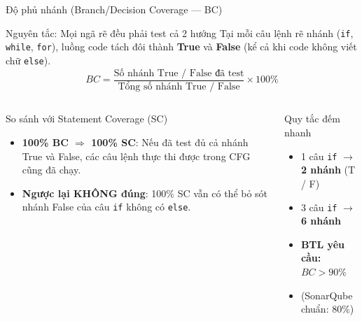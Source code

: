 \documentclass[aspectratio=169,12pt]{beamer}
\begin{document}
\begin{frame}[shrink=10]{Độ phủ nhánh (Branch/Decision Coverage --- BC)}
  \begin{block}{Nguyên tắc: Mọi ngã rẽ đều phải test cả 2 hướng}
    Tại mỗi câu lệnh rẽ nhánh (\texttt{if}, \texttt{while}, \texttt{for}), luồng code tách đôi thành \textbf{True} và \textbf{False} (kể cả khi code không viết chữ \texttt{else}).
    \[
      BC = \frac{\text{Số nhánh True / False đã test}}{\text{Tổng số nhánh True / False}} \times 100\%
    \]
  \end{block}

  \vspace{0.2em}
  \begin{columns}[T]
    \begin{alertblock}{So sánh với Statement Coverage (SC)}
      \small
      \begin{itemize}
        \item \textbf{100\% BC $\Rightarrow$ 100\% SC}: Nếu đã test đủ cả nhánh True và False, các câu lệnh thực thi được trong CFG cũng đã chạy.
        \item \textbf{Ngược lại KHÔNG đúng}: 100\% SC vẫn có thể bỏ sót nhánh False của câu \texttt{if} không có \texttt{else}.
      \end{itemize}
    \end{alertblock}

    \begin{exampleblock}{Quy tắc đếm nhanh}
      \small
      \begin{itemize}
        \item 1 câu \texttt{if} $\to$ \textbf{2 nhánh} (T / F)
        \item 3 câu \texttt{if} $\to$ \textbf{6 nhánh}
        \item \textbf{BTL yêu cầu:} $BC > 90\%$
        \item (SonarQube chuẩn: 80\%)
      \end{itemize}
    \end{exampleblock}
  \end{columns}
\end{frame}
\end{document}
